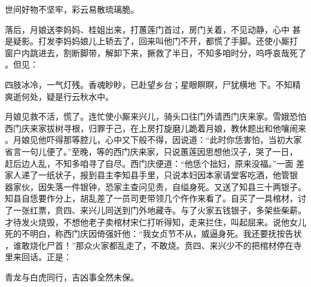 世间好物不坚牢，彩云易散琉璃脆。

落后，月娘送李妈妈、桂姐出来，打蕙莲门首过，房门关着，不见动静，心中
甚是疑影。打发李妈妈娘儿上轿去了，回来叫他门不开，都慌了手脚。还使小厮打
窗户内跳进去，割断脚带，解卸下来，撅救了半日，不知多咱时分，呜呼哀哉死了
。但见：

四肢冰冷，一气灯残。香魂眇眇，已赴望乡台；星眼瞑瞑，尸犹横地
下。不知精爽逝何处，疑是行云秋水中。

月娘见救不活，慌了。连忙使小厮来兴儿，骑头口往门外请西门庆来家。雪娥恐怕
西门庆来家拔树寻根，归罪于己，在上房打旋磨儿跪着月娘，教休题出和他嚷闹来
。月娘见他吓得那等腔儿，心中又下般不得，因说道：“此时你恁害怕，当初大家
省言一句儿便了。”至晚，等的西门庆来家，只说蕙莲因思想他汉子，哭了一日，
赶后边人乱，不知多咱寻了自尽。西门庆便道：“他恁个拙妇，原来没福。”一面
差家人递了一纸状子，报到县主李知县手里，只说本妇因本家请堂客吃酒，他管银
器家伙，因失落一件银钟，恐家主查问见责，自缢身死。又送了知县三十两银子。
知县自恁要作分上，胡乱差了一员司吏带领几个仵作来看了。自买了一具棺材，讨
了一张红票，贲四、来兴儿同送到门外地藏寺。与了火家五钱银子，多架些柴薪。
才待发火烧毁，不想他老子卖棺材宋仁打听得知，走来拦住，叫起屈来。说他女儿
死的不明白，称西门庆因倚强奸他：“我女贞节不从，威逼身死。我还要抚按告状
，谁敢烧化尸首！”那众火家都乱走了，不敢烧。贲四、来兴少不的把棺材停在寺
里来回话。正是：

青龙与白虎同行，吉凶事全然未保。